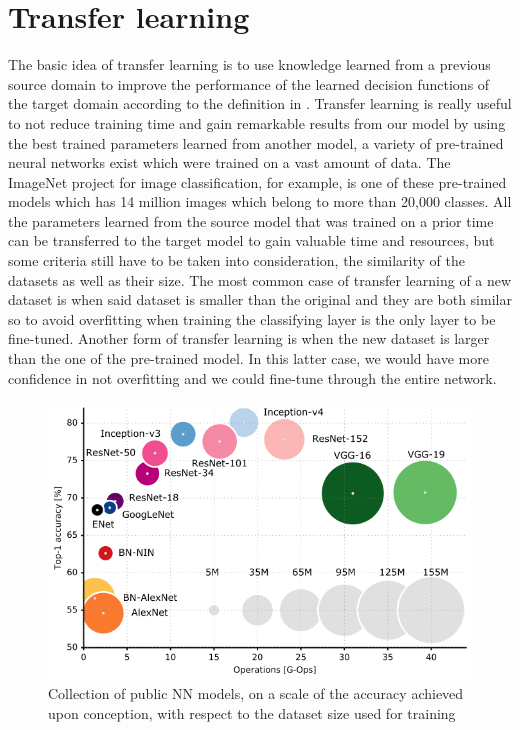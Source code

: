 \documentclass[11pt]{article}
\begin{document}
\section{Transfer learning}
The basic idea of transfer learning is to use knowledge learned from a previous source domain to improve the performance of the learned decision functions of the target domain according to the definition in \cite{zhuang2019comprehensive}. Transfer learning is really useful to not reduce training time and gain remarkable results from our model by using the best trained parameters learned from another model, a variety of pre-trained neural networks exist which were trained on a vast amount of data. The ImageNet project for image classification, for example, is one of these pre-trained models which has 14 million images which belong to more than 20,000 classes. All the parameters learned from the source model that was trained on a prior time can be transferred to the target model to gain valuable time and resources, but some criteria still have to be taken into consideration, the similarity of the datasets as well as their size. The most common case of transfer learning of a new dataset is when said dataset is smaller than the original and they are both similar so to avoid overfitting when training the classifying layer is the only layer to be fine-tuned. Another form of transfer learning is when the new dataset is larger than the one of the pre-trained model. In this latter case, we would have more confidence in not overfitting and we could fine-tune through the entire network.

\begin{figure}[H]
    \centering
    \includegraphics[width=0.8\linewidth, frame]{tl.png}
    \caption{\small Collection of public NN models, on a scale of the  accuracy achieved upon conception, with respect to the dataset size used for training}
    \label{fig:pre_trained}
\end{figure}
\end{document}
